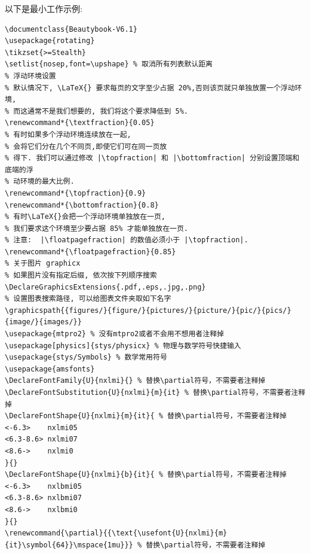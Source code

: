\documentclass{Beautybook-V6.1}
\renewcommand*{\textfraction}{0.05}
\renewcommand*{\topfraction}{0.9}
\renewcommand*{\bottomfraction}{0.8}
\renewcommand*{\floatpagefraction}{0.85}
\renewcommand{\partial}{{\text{\usefont{U}{nxlmi}{m}{it}\symbol{64}}\mspace{1mu}}}
\begin{document}
以下是最小工作示例:
\begin{lstlisting}
\documentclass{Beautybook-V6.1}
\usepackage{rotating}
\tikzset{>=Stealth}
\setlist{nosep,font=\upshape} % 取消所有列表默认距离
% 浮动环境设置
% 默认情况下, \LaTeX{} 要求每页的文字至少占据 20%,否则该页就只单独放置一个浮动环境,
% 而这通常不是我们想要的, 我们将这个要求降低到 5%.
\renewcommand*{\textfraction}{0.05}
% 有时如果多个浮动环境连续放在一起,
% 会将它们分在几个不同页,即使它们可在同一页放
% 得下. 我们可以通过修改 |\topfraction| 和 |\bottomfraction| 分别设置顶端和底端的浮
% 动环境的最大比例.
\renewcommand*{\topfraction}{0.9}
\renewcommand*{\bottomfraction}{0.8}
% 有时\LaTeX{}会把一个浮动环境单独放在一页,
% 我们要求这个环境至少要占据 85% 才能单独放在一页.
% 注意:  |\floatpagefraction| 的数值必须小于 |\topfraction|.
\renewcommand*{\floatpagefraction}{0.85}
% 关于图片 graphicx
% 如果图片没有指定后缀, 依次按下列顺序搜索
\DeclareGraphicsExtensions{.pdf,.eps,.jpg,.png}
% 设置图表搜索路径, 可以给图表文件夹取如下名字
\graphicspath{{figures/}{figure/}{pictures/}{picture/}{pic/}{pics/}{image/}{images/}}
\usepackage{mtpro2} % 没有mtpro2或者不会用不想用者注释掉
\usepackage[physics]{stys/physicx} % 物理与数学符号快捷输入
\usepackage{stys/Symbols} % 数学常用符号
\usepackage{amsfonts}
\DeclareFontFamily{U}{nxlmi}{} % 替换\partial符号，不需要者注释掉
\DeclareFontSubstitution{U}{nxlmi}{m}{it} % 替换\partial符号，不需要者注释掉
\DeclareFontShape{U}{nxlmi}{m}{it}{ % 替换\partial符号，不需要者注释掉
<-6.3>    nxlmi05
<6.3-8.6> nxlmi07
<8.6->    nxlmi0
}{}
\DeclareFontShape{U}{nxlmi}{b}{it}{ % 替换\partial符号，不需要者注释掉
<-6.3>    nxlbmi05
<6.3-8.6> nxlbmi07
<8.6->    nxlbmi0
}{}
\renewcommand{\partial}{{\text{\usefont{U}{nxlmi}{m}{it}\symbol{64}}\mspace{1mu}}} % 替换\partial符号，不需要者注释掉


\end{lstlisting}
\end{document}
